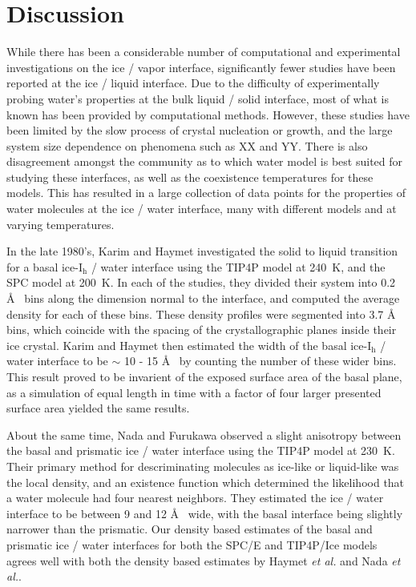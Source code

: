 \section{Discussion}
While there has been a considerable number of computational and
experimental investigations on the ice / vapor interface,
significantly fewer studies have been reported at the ice / liquid
interface. Due to the difficulty of experimentally probing water's
properties at the bulk liquid / solid interface, most of what is known
has been provided by computational methods. However, these studies
have been limited by the slow process of crystal nucleation or growth,
and the large system size dependence on phenomena such as XX and
YY. There is also disagreement amongst the community as to which water
model is best suited for studying these interfaces, as well as the
coexistence temperatures for these models. This has resulted in a
large collection of data points for the properties of water molecules
at the ice / water interface, many with different models and at
varying temperatures. 

In the late 1980's, Karim and Haymet investigated the solid to liquid
transition for a basal ice-I$_\mathrm{h}$ / water interface using the
TIP4P model at 240~K\cite{Karim1987,Karim1988}, and the SPC model at
200~K.\cite{Karim1990} In each of the studies, they divided their
system into 0.2 \AA~ bins along the dimension normal to the interface,
and computed the average density for each of these bins. These density
profiles were segmented into 3.7 \AA~ bins, which coincide with the
spacing of the crystallographic planes inside their ice crystal. Karim
and Haymet then estimated the width of the basal ice-I$_\mathrm{h}$ /
water interface to be $\sim$ 10 - 15 \AA~ by counting the number of
these wider bins. This result proved to be invarient of the exposed
surface area of the basal plane, as a simulation of equal length in
time with a factor of four larger presented surface area yielded the
same results.

About the same time, Nada and Furukawa observed a slight anisotropy
between the basal and prismatic ice / water interface using the TIP4P
model at 230~K. Their primary method for descriminating molecules as
ice-like or liquid-like was the local density, and an existence
function which determined the likelihood that a water molecule had
four nearest neighbors. They estimated the ice / water interface to be
between 9 and 12 \AA~ wide, with the basal interface being slightly
narrower than the prismatic.\cite{Nada1995} Our density based
estimates of the basal and prismatic ice / water interfaces for both
the SPC/E and TIP4P/Ice models agrees well with both the density based
estimates by Haymet \textit{et al.} and Nada \textit{et al.}.

